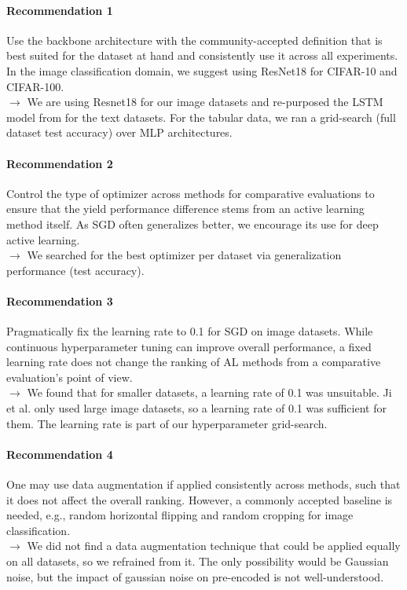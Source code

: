 \documentclass[]{article}
\begin{document}
\paragraph{Recommendation 1} Use the backbone architecture with
the community-accepted definition that is best suited
for the dataset at hand and consistently use it across all
experiments. In the image classification domain, we
suggest using ResNet18 for CIFAR-10 and CIFAR-100. \\
$\rightarrow$ We are using Resnet18 for our image datasets and re-purposed the LSTM model from \cite{zhou2021towards} for the text datasets.
For the tabular data, we ran a grid-search (full dataset test accuracy) over MLP architectures.

\paragraph{Recommendation 2} Control the type of optimizer across
methods for comparative evaluations to ensure that the
yield performance difference stems from an active learning method itself. As SGD often generalizes better, we
encourage its use for deep active learning.\\
$\rightarrow$ We searched for the best optimizer per dataset via generalization performance (test accuracy). 

\paragraph{Recommendation 3} Pragmatically fix the learning rate
to 0.1 for SGD on image datasets. While continuous
hyperparameter tuning can improve overall performance,
a fixed learning rate does not change the ranking of AL
methods from a comparative evaluation’s point of view.\\
$\rightarrow$ We found that for smaller datasets, a learning rate of 0.1 was unsuitable. Ji et al. only used large image datasets, so a learning rate of 0.1 was sufficient for them. The learning rate is part of our hyperparameter grid-search.

\paragraph{Recommendation 4} One may use data augmentation if
applied consistently across methods, such that it does
not affect the overall ranking. However, a commonly
accepted baseline is needed, e.g., random horizontal flipping and random cropping for image classification.\\
$\rightarrow$ We did not find a data augmentation technique that could be applied equally on all datasets, so we refrained from it.
The only possibility would be Gaussian noise, but the impact of gaussian noise on pre-encoded is not well-understood.
\end{document}

